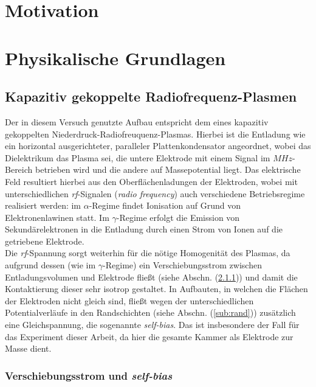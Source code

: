 \documentclass[numbers=noenddot,a4paper]{scrartcl}
\newcommand{\tilt}[1]{\textit{#1}}
\begin{document}
	\thispagestyle{empty}
	
	\newpage
	
	\tableofcontents
	
	\newpage
	
	\section{Motivation}\label{sec:einleitung}
	
	\newpage
	
	\section{Physikalische Grundlagen}\label{sec:physg}
	
		\subsection{Kapazitiv gekoppelte Radiofrequenz-Plasmen}
		
			Der in diesem Versuch genutzte Aufbau entspricht dem eines kapazitiv gekoppelten Niederdruck-Radiofreuquenz-Plasmas. Hierbei ist die Entladung wie ein horizontal ausgerichteter, paralleler Plattenkondensator angeordnet, wobei das Dielektrikum das Plasma sei, die untere Elektrode mit einem Signal im $\unit{MHz}$-Bereich betrieben wird und die andere auf Massepotential liegt. Das elektrische Feld resultiert hierbei aus den Oberflächenladungen der Elektroden, wobei mit unterschiedlichen \tilt{rf}-Signalen (\tilt{radio frequency}) auch verschiedene Betriebsregime realisiert werden: im $\alpha$-Regime findet Ionisation auf Grund von Elektronenlawinen statt. Im $\gamma$-Regime erfolgt die Emission von Sekundärelektronen in die Entladung durch einen Strom von Ionen auf die getriebene Elektrode.\\
			Die \tilt{rf}-Spannung sorgt weiterhin für die nötige Homogenität des Plasmas, da aufgrund dessen (wie im $\gamma$-Regime) ein Verschiebungsstrom zwischen Entladungsvolumen und Elektrode fließt (siehe Abschn. (\ref{subsub:self-bias})) und damit die Kontaktierung dieser sehr isotrop gestaltet. In Aufbauten, in welchen die Flächen der Elektroden nicht gleich sind, fließt wegen der unterschiedlichen Potentialverläufe in den Randschichten (siehe Abschn. (\ref{sub:rand})) zusätzlich eine Gleichspannung, die sogenannte \tilt{self-bias}. Das ist insbesondere der Fall für das Experiment dieser Arbeit, da hier die gesamte Kammer als Elektrode zur Masse dient.

		\subsubsection{Verschiebungsstrom und \tilt{self-bias}} \label{subsub:self-bias}
		
\end{document}
